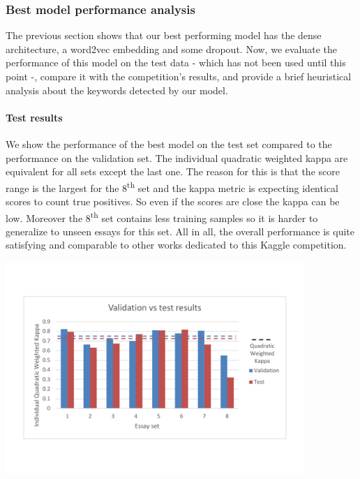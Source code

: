 \documentclass[a4paper,12pt,english]{article}
\begin{document}
\subsubsection{Best model performance analysis}
The previous section shows that our best performing model has the dense architecture, a word2vec embedding and some dropout. Now, we evaluate the performance of this model on the test data - which has not been used until this point -, compare it with the competition's results, and provide a brief heuristical analysis about the keywords detected by our model.

\paragraph{Test results} We show the performance of the best model on the test set compared to the performance on the validation set. The individual quadratic weighted kappa are equivalent for all sets except the last one. The reason for this is that the score range is the largest for the 8\textsuperscript{th} set and the kappa metric is expecting identical scores to count true positives. So even if the scores are close the kappa can be low. Moreover the 8\textsuperscript{th} set contains less training samples so it is harder to generalize to unseen essays for this set. All in all, the overall performance is quite satisfying and comparable to other works dedicated to this Kaggle competition.

\begin{center}
\vspace*{-1.5cm}
\includegraphics[width=0.85\textwidth]{fig/test.pdf}
\vspace*{-1.5cm}
\end{center}
\end{document}

